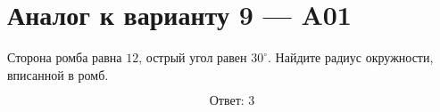 


\section*{Аналог к варианту 9 — A01}
Сторона ромба равна \(12\), острый угол равен \(30^\circ\). Найдите радиус окружности, вписанной в ромб.
\begin{center}\end{center}
\[\boxed{\text{Ответ: }3}\]

